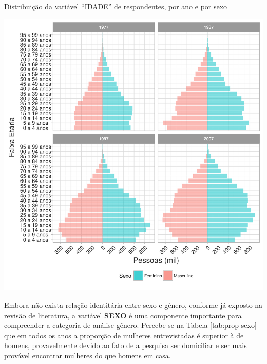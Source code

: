 \begin{grafico}[htb]%
    \caption{\label{graf:distr-idade}Distribuição da variável ``IDADE'' de respondentes, por ano e por sexo}%
    \begin{center}%
        \includegraphics[width=1\textwidth]{./imagens/idade.png}%
    \end{center}%
\end{grafico}%

Embora não exista relação identitária entre sexo e gênero, conforme já exposto na revisão de literatura, a variável \textbf{SEXO} é uma componente importante para compreender a categoria de análise gênero. Percebe-se na Tabela \ref{tab:prop-sexo} que em todos os anos a proporção de mulheres entrevistadas é superior à de homens, provavelmente devido ao fato de a pesquisa ser domiciliar e ser mais provável encontrar mulheres do que homens em casa.

